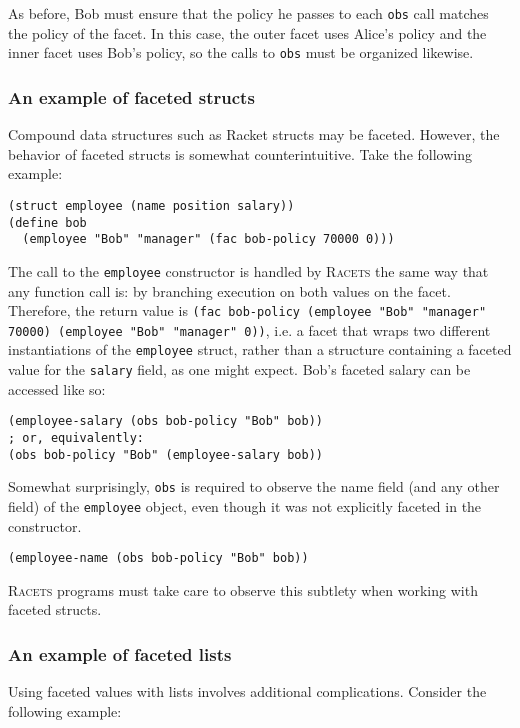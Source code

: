\documentclass{article}
\begin{document}
As before, Bob must ensure that the policy he passes to each \texttt{obs} call matches the policy of the facet. In this case, the outer facet uses Alice's policy and the inner facet uses Bob's policy, so the calls to \texttt{obs} must be organized likewise.


\subsubsection{An example of faceted structs}
Compound data structures such as Racket structs may be faceted. However, the behavior of faceted structs is somewhat counterintuitive. Take the following example:

\begin{lstlisting}
(struct employee (name position salary))
(define bob
  (employee "Bob" "manager" (fac bob-policy 70000 0)))
\end{lstlisting}

The call to the \texttt{employee} constructor is handled by \textsc{Racets} the same way that any function call is: by branching execution on both values on the facet. Therefore, the return value is \texttt{(fac bob-policy (employee "Bob" "manager" 70000) (employee "Bob" "manager" 0))}, i.e. a facet that wraps two different instantiations of the \texttt{employee} struct, rather than a structure containing a faceted value for the \texttt{salary} field, as one might expect. Bob's faceted salary can be accessed like so:

\begin{lstlisting}
(employee-salary (obs bob-policy "Bob" bob))
; or, equivalently:
(obs bob-policy "Bob" (employee-salary bob))
\end{lstlisting}

Somewhat surprisingly, \texttt{obs} is required to observe the name field (and any other field) of the \texttt{employee} object, even though it was not explicitly faceted in the constructor.

\begin{lstlisting}
(employee-name (obs bob-policy "Bob" bob))
\end{lstlisting}

\textsc{Racets} programs must take care to observe this subtlety when working with faceted structs.


\subsubsection{An example of faceted lists}
Using faceted values with lists involves additional complications. Consider the following example:
\end{document}

